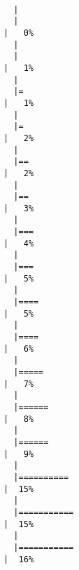 \documentclass[
  letterpaper,
]{book}
\begin{document}
\begin{verbatim}

  |                                                                            
  |                                                                      |   0%
  |                                                                            
  |                                                                      |   1%
  |                                                                            
  |=                                                                     |   1%
  |                                                                            
  |=                                                                     |   2%
  |                                                                            
  |==                                                                    |   2%
  |                                                                            
  |==                                                                    |   3%
  |                                                                            
  |===                                                                   |   4%
  |                                                                            
  |===                                                                   |   5%
  |                                                                            
  |====                                                                  |   5%
  |                                                                            
  |====                                                                  |   6%
  |                                                                            
  |=====                                                                 |   7%
  |                                                                            
  |======                                                                |   8%
  |                                                                            
  |======                                                                |   9%
  |                                                                            
  |==========                                                            |  15%
  |                                                                            
  |===========                                                           |  15%
  |                                                                            
  |===========                                                           |  16%

\end{verbatim}
\end{document}
